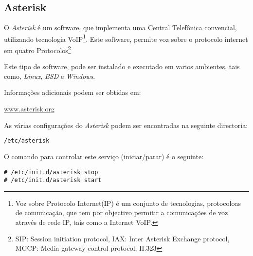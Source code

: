 \subsection{Asterisk}

O \emph{Asterisk} é um software, que implementa uma Central Telefônica convencial, utilizando tecnologia \textsf{VoIP}\footnote{Voz sobre Protocolo Internet(IP) é um conjunto de tecnologias, protocoloas de comunicação, que tem por objectivo permitir a comunicações de voz através de rede IP, tais como a Internet \textsf{VoIP}.}. Este software, permite voz sobre o protocolo internet em quatro Protocolos\footnote{SIP: Session initiation protocol, IAX:  Inter Asterisk Exchange protocol, MGCP: Media gateway control protocol, H.323}  


Este tipo de software, pode ser instalado e executado em varios ambientes, tais como, \emph{Linux}, \emph{BSD} e \emph{Windows}.

Informações adicionais podem ser obtidas em:\\ \begin{normalsize}\sffamily\href{http://www.asterisk.org/}{www.asterisk.org}\end{normalsize}

As várias configurações do \emph{Asterisk} podem ser encontradas na seguinte directoria:

\begin{Verbatim}[commandchars=\\\{\}]
/etc/asterisk
\end{Verbatim}

O comando para controlar este serviço (iniciar/parar) é o seguinte:

\begin{Verbatim}[commandchars=\\\{\}]
# /etc/init.d/asterisk stop
# /etc/init.d/asterisk start
\end{Verbatim}


